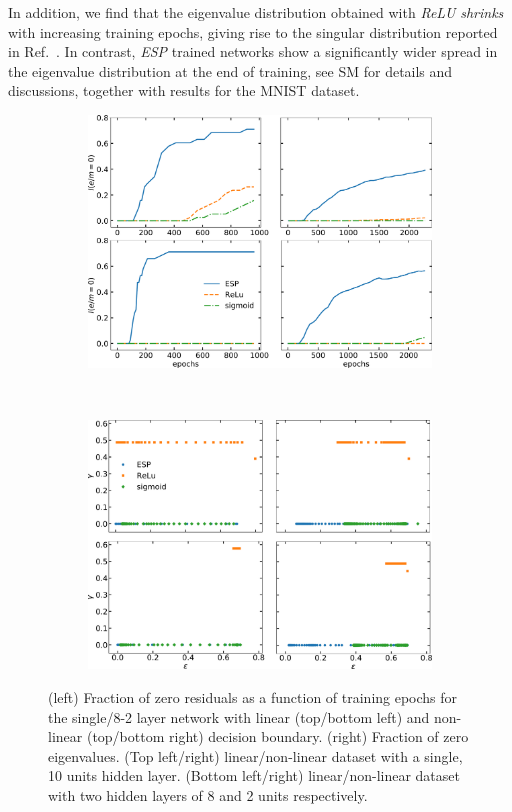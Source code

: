 \documentclass[5p]{elsarticle}
\begin{document}
%
 In addition, we find that the eigenvalue distribution obtained with {\it ReLU}  {\it shrinks} with increasing training epochs, giving rise to the singular distribution reported in Ref.~\cite{penn1, levent}. In contrast, {\it ESP} trained networks show a significantly wider spread in the eigenvalue distribution at the end of training, see SM for details and discussions, together with results for the MNIST dataset.
%
\begin{figure}[t!]
 \centering
 	\begin{subfigure}[b]{0.48\textwidth}
 	\includegraphics[width=\textwidth]{residues.pdf}
	\label{fig:res}
	\end{subfigure}
	~
	\begin{subfigure}[b]{0.48\textwidth}
 	\includegraphics[width=\textwidth]{gamma.pdf}
	\label{fig:gamma}
	\end{subfigure}
\caption{ \label{fig:res} (left) Fraction of zero residuals as a function of training epochs for the single/8-2 layer network with linear (top/bottom left) and non-linear (top/bottom right) decision boundary. (right) Fraction of zero eigenvalues. (Top left/right) linear/non-linear dataset with a single, 10 units hidden layer. (Bottom left/right)  linear/non-linear dataset with two hidden layers of 8 and 2 units respectively. }
\end{figure}
%
\end{document}
